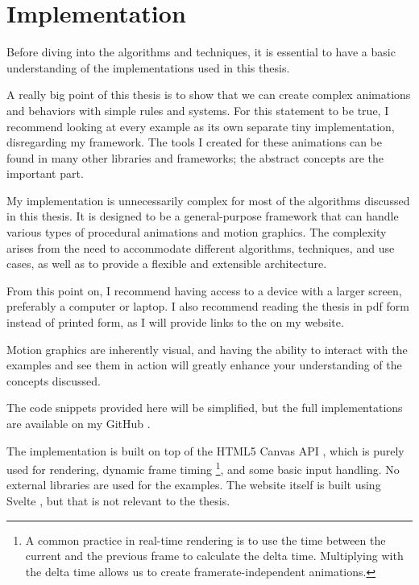 \pagebreak

\section{Implementation}
\label{sec:implementation}

Before diving into the algorithms and techniques, it is essential to have a basic understanding of the implementations used in this thesis.

A really big point of this thesis is to show that we can create complex animations and behaviors with simple rules and systems. For this statement to be true, I recommend looking at every example as its own separate tiny implementation, disregarding my framework. The tools I created for these animations can be found in many other libraries and frameworks; the abstract concepts are the important part.

\begin{Note}
    My implementation is unnecessarily complex for most of the algorithms discussed in this thesis. It is designed to be a general-purpose framework that can handle various types of procedural animations and motion graphics. The complexity arises from the need to accommodate different algorithms, techniques, and use cases, as well as to provide a flexible and extensible architecture.
\end{Note}

From this point on, I recommend having access to a device with a larger screen, preferably a computer or laptop. I also recommend reading the thesis in pdf form instead of printed form, as I will provide links to the \examples on my website. 

Motion graphics are inherently visual, and having the ability to interact with the examples and see them in action will greatly enhance your understanding of the concepts discussed.

\begin{Note}
    The code snippets provided here will be simplified, but the full implementations are available on my GitHub \repository.
\end{Note}

The implementation is built on top of the HTML5 Canvas API \cite{mdn-canvas-api}, which is purely used for rendering, dynamic frame timing \footnote{A common practice in real-time rendering is to use the time between the current and the previous frame to calculate the delta time. Multiplying with the delta time allows us to create framerate-independent animations.}, and some basic input handling. No external libraries are used for the examples. The website itself is built using Svelte \cite{svelte}, but that is not relevant to the thesis.

